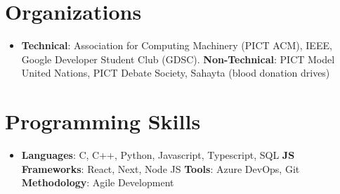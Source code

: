 \documentclass[letterpaper,11pt]{article}
\newcommand{\resumeSubHeadingListStart}{\begin{itemize}[leftmargin=*]}
\newcommand{\resumeSubHeadingListEnd}{\end{itemize}}
\begin{document}
\section{Organizations}
 \resumeSubHeadingListStart
   \item{
     \textbf{Technical}{: Association for Computing Machinery (PICT ACM), IEEE, Google Developer Student Club (GDSC).}
     \textbf{Non-Technical}{: PICT Model United Nations, PICT Debate Society, Sahayta (blood donation drives)}
   }
 \resumeSubHeadingListEnd

%
\section{Programming Skills}
 \resumeSubHeadingListStart
   \item{
     \textbf{Languages}{: C, C++, Python, Javascript, Typescript, SQL}
     \hfill
     \textbf{JS Frameworks}{: React, Next, Node JS}
     \newline
     \textbf{Tools}{: Azure DevOps, Git}
     \; \; \; \; \; \; \; \; \; \; \; \; \; \; \; \; \; \; \; \; \; \; \; \; \; \; \; \; \; \: \:
     \textbf{Methodology}{: Agile Development}
   }
 \resumeSubHeadingListEnd


\end{document}
